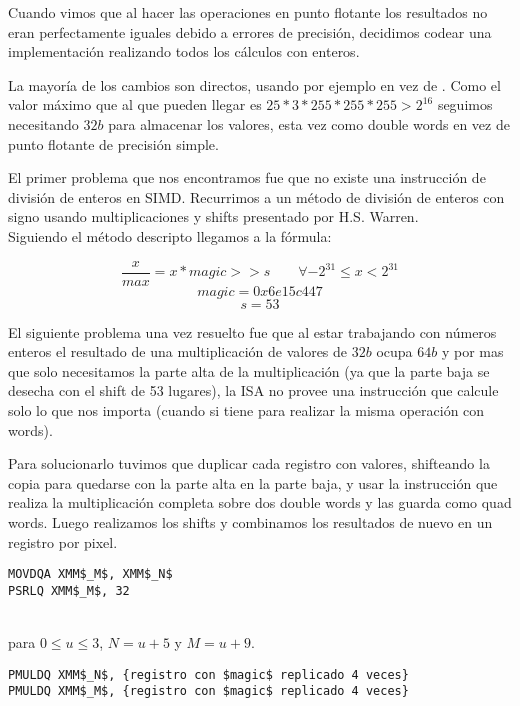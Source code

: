 Cuando vimos que al hacer las operaciones en punto flotante los resultados no eran perfectamente iguales debido a errores de precisión, decidimos codear una implementación realizando todos los cálculos con enteros.

La mayoría de los cambios son directos, usando por ejemplo  en vez de . Como el valor máximo que al que pueden llegar es $25 * 3 * 255 * 255 * 255 > 2^{16}$ seguimos necesitando $32b$ para almacenar los valores, esta vez como double words en vez de punto flotante de precisión simple.

El primer problema que nos encontramos fue que no existe una instrucción de división de enteros en SIMD. Recurrimos a un método de división de enteros con signo usando multiplicaciones y shifts presentado por H.S. Warren\textsuperscript{\cite[Chapter~10]{hackersdelight}}. \\
Siguiendo el método descripto llegamos a la fórmula:

$$ \frac{x}{max} = x * magic >> s \qquad \forall -2^{31} \le x < 2^{31} $$
$$ magic = 0x6e15c447 $$
$$ s = 53 $$

El siguiente problema una vez resuelto fue que al estar trabajando con números enteros el resultado de una multiplicación de valores de $32b$ ocupa $64b$ y por mas que solo necesitamos la parte alta de la multiplicación (ya que la parte baja se desecha con el shift de 53 lugares), la ISA no provee una instrucción que calcule solo lo que nos importa (cuando si tiene  para realizar la misma operación con words).

Para solucionarlo tuvimos que duplicar cada registro con valores, shifteando la copia para quedarse con la parte alta en la parte baja, y usar la instrucción  que realiza la multiplicación completa sobre dos double words y las guarda como quad words.
Luego realizamos los shifts y combinamos los resultados de nuevo en un registro por pixel.

\begin{lstlisting}
MOVDQA XMM$_M$, XMM$_N$
PSRLQ XMM$_M$, 32
\end{lstlisting}

 

  \\
para $0 \le u \le 3$, $N = u+5$ y $M = u+9$.

\begin{lstlisting}
PMULDQ XMM$_N$, {registro con $magic$ replicado 4 veces}
PMULDQ XMM$_M$, {registro con $magic$ replicado 4 veces}
\end{lstlisting}

